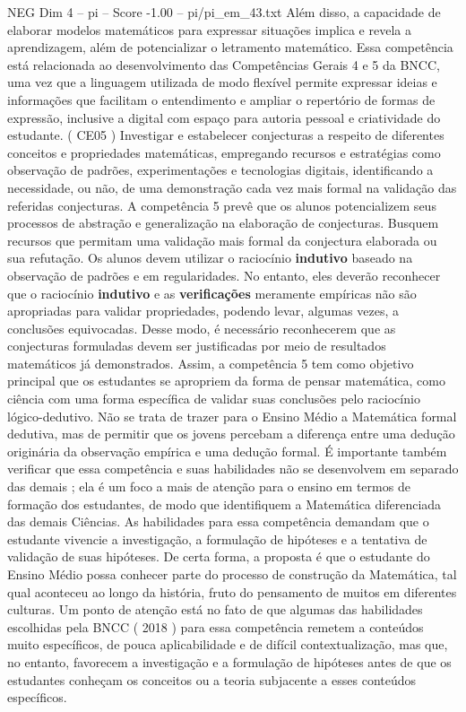 \begin{textsample}{NEG Dim 4 – pi – Score -1.00 – pi/pi\_em\_43.txt}
Além disso, a capacidade de elaborar modelos matemáticos para expressar situações implica e revela a aprendizagem, além de potencializar o letramento matemático.
Essa competência está relacionada ao desenvolvimento das Competências Gerais 4 e 5 da BNCC, uma vez que a linguagem utilizada de modo flexível permite expressar ideias e informações que facilitam o entendimento e ampliar o repertório de formas de expressão, inclusive a digital com espaço para autoria pessoal e criatividade do estudante. ( CE05 ) Investigar e estabelecer conjecturas a respeito de diferentes conceitos e propriedades matemáticas, empregando recursos e estratégias como observação de padrões, experimentações e tecnologias digitais, identificando a necessidade, ou não, de uma demonstração cada vez mais formal na validação das referidas conjecturas.
A competência 5 prevê que os alunos potencializem seus processos de abstração e generalização na elaboração de conjecturas.
Busquem recursos que permitam uma validação mais formal da conjectura elaborada ou sua refutação.
Os alunos devem utilizar o raciocínio \textbf{indutivo} baseado na observação de padrões e em regularidades.
No entanto, eles deverão reconhecer que o raciocínio \textbf{indutivo} e as \textbf{verificações} meramente empíricas não são apropriadas para validar propriedades, podendo levar, algumas vezes, a conclusões equivocadas.
Desse modo, é necessário reconhecerem que as conjecturas formuladas devem ser justificadas por meio de resultados matemáticos já demonstrados.
Assim, a competência 5 tem como objetivo principal que os estudantes se apropriem da forma de pensar matemática, como ciência com uma forma específica de validar suas conclusões pelo raciocínio lógico-dedutivo.
Não se trata de trazer para o Ensino Médio a Matemática formal dedutiva, mas de permitir que os jovens percebam a diferença entre uma dedução originária da observação empírica e uma dedução formal.
É importante também verificar que essa competência e suas habilidades não se desenvolvem em separado das demais ; ela é um foco a mais de atenção para o ensino em termos de formação dos estudantes, de modo que identifiquem a Matemática diferenciada das demais Ciências.
As habilidades para essa competência demandam que o estudante vivencie a investigação, a formulação de hipóteses e a tentativa de validação de suas hipóteses.
De certa forma, a proposta é que o estudante do Ensino Médio possa conhecer parte do processo de construção da Matemática, tal qual aconteceu ao longo da história, fruto do pensamento de muitos em diferentes culturas.
Um ponto de atenção está no fato de que algumas das habilidades escolhidas pela BNCC ( 2018 ) para essa competência remetem a conteúdos muito específicos, de pouca aplicabilidade e de difícil contextualização, mas que, no entanto, favorecem a investigação e a formulação de hipóteses antes de que os estudantes conheçam os conceitos ou a teoria subjacente a esses conteúdos específicos.

\end{textsample}
